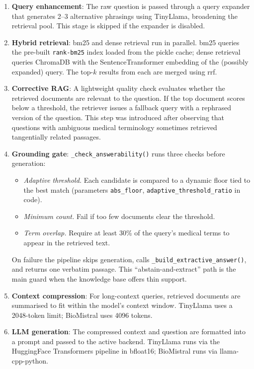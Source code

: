{\sloppy
\begin{enumerate}
    \item \textbf{Query enhancement}: The raw question is passed through a query expander that generates 2--3 alternative phrasings using TinyLlama, broadening the retrieval pool. This stage is skipped if the expander is disabled.
    \item \textbf{Hybrid retrieval}: \ac{bm25} and dense retrieval run in parallel. \ac{bm25} queries the pre-built \texttt{rank-bm25} index loaded from the pickle cache; dense retrieval queries ChromaDB with the SentenceTransformer embedding of the (possibly expanded) query. The top-$k$ results from each are merged using \ac{rrf}.
    \item \textbf{Corrective RAG}: A lightweight quality check evaluates whether the retrieved documents are relevant to the question. If the top document scores below a threshold, the retriever issues a fallback query with a rephrased version of the question. This step was introduced after observing that questions with ambiguous medical terminology sometimes retrieved tangentially related passages.
    \item \textbf{Grounding gate}: \texttt{\_check\_answerability()} runs three checks before generation:
    \begin{itemize}
        \item \textit{Adaptive threshold.} Each candidate is compared to a dynamic floor tied to the best match (parameters \texttt{abs\_floor}, \texttt{adaptive\_threshold\_ratio} in code).
        \item \textit{Minimum count.} Fail if too few documents clear the threshold.
        \item \textit{Term overlap.} Require at least 30\% of the query's medical terms to appear in the retrieved text.
    \end{itemize}
    On failure the pipeline skips generation, calls \texttt{\_build\_extractive\_answer()}, and returns one verbatim passage. This ``abstain-and-extract'' path is the main guard when the knowledge base offers thin support.
    \item \textbf{Context compression}: For long-context queries, retrieved documents are summarised to fit within the model's context window. TinyLlama uses a 2048-token limit; BioMistral uses 4096 tokens.
    \item \textbf{LLM generation}: The compressed context and question are formatted into a prompt and passed to the active backend. TinyLlama runs via the HuggingFace Transformers pipeline in bfloat16; BioMistral runs via llama-cpp-python.

\end{enumerate}}
